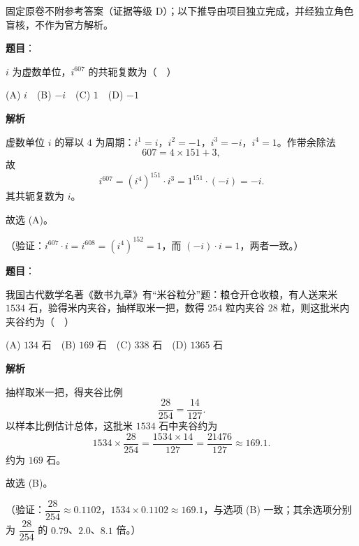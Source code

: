 
\begin{gktip}
固定原卷不附参考答案（证据等级 D）；以下推导由项目独立完成，并经独立角色盲核，不作为官方解析。
\end{gktip}

\begin{answer}

\textbf{题目}：

\(i\) 为虚数单位，\(i^{607}\) 的共轭复数为（　）

(A) \(i\)　(B) \(-i\)　(C) \(1\)　(D) \(-1\)

\textbf{解析}

虚数单位 \(i\) 的幂以 \(4\) 为周期：\(i^1=i\)，\(i^2=-1\)，\(i^3=-i\)，\(i^4=1\)。作带余除法
\nopagebreak[4]
\[
607=4\times151+3,
\]
故
\nopagebreak[4]
\[
i^{607}=(i^4)^{151}\cdot i^3=1^{151}\cdot(-i)=-i.
\]
其共轭复数为 \(i\)。

故选 (A)。

（验证：\(i^{607}\cdot i=i^{608}=(i^4)^{152}=1\)，而 \((-i)\cdot i=1\)，两者一致。）


\end{answer}
\begin{answer}

\textbf{题目}：

我国古代数学名著《数书九章》有“米谷粒分”题：粮仓开仓收粮，有人送来米 \(1534\) 石，验得米内夹谷，抽样取米一把，数得 \(254\) 粒内夹谷 \(28\) 粒，则这批米内夹谷约为（　）

(A) \(134\) 石　(B) \(169\) 石　(C) \(338\) 石　(D) \(1365\) 石

\textbf{解析}

抽样取米一把，得夹谷比例
\nopagebreak[4]
\[
\dfrac{28}{254}=\dfrac{14}{127}.
\]
以样本比例估计总体，这批米 \(1534\) 石中夹谷约为
\nopagebreak[4]
\[
1534\times\dfrac{28}{254}=\dfrac{1534\times14}{127}
=\dfrac{21476}{127}\approx169.1.
\]
约为 \(169\) 石。

故选 (B)。

（验证：\(\dfrac{28}{254}\approx0.1102\)，\(1534\times0.1102\approx169.1\)，与选项 (B) 一致；其余选项分别为 \(\dfrac{28}{254}\) 的 \(0.79\)、\(2.0\)、\(8.1\) 倍。）


\end{answer}
